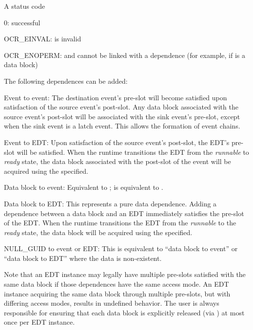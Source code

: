 \returns
A status code
\begin{DoxyItemize}
\item 0\-: successful
\item OCR\_EINVAL:  is invalid
\item OCR\_ENOPERM:  and  cannot be linked with
  a dependence (for example, if  is a data block)
\end{DoxyItemize}

\descr
The following dependences can be added:
\begin{DoxyItemize}
\item Event to event: The destination event's pre-slot will become satisfied
  upon satisfaction of the source event's post-slot. Any data block associated
  with the source event's post-slot will be associated with the sink event's pre-slot,
  except when the sink event is a latch event. This allows the formation of event chains.
\item Event to EDT: Upon satisfaction of the source event's post-slot, the EDT's
  pre-slot will be satisfied. When the runtime transitions the EDT from the
  \emph{runnable} to \emph{ready} state, the data block associated with the
  post-slot of the event will be acquired using the  specified.
\item Data block to event: Equivalent to \hyperlink{func_ocrEventSatisfySlot}{
  };  is
  equivalent to .
\item Data block to EDT: This represents a pure data dependence. Adding a
  dependence between a data block and an EDT immediately satisfies the pre-slot
  of the EDT. When the runtime transitions the EDT from the \emph{runnable}
  to the \emph{ready} state, the data block will be acquired using the
   specified.
\item NULL\_GUID to event or EDT: This is equivalent to ``data block to event''
  or ``data block to EDT'' where the data is non-existent.
\end{DoxyItemize}

Note that an EDT instance may legally have multiple pre-slots satisfied with the same
data block if those dependences have the same access mode. An EDT instance acquiring the
same data block through multiple pre-slots, but with differing access modes, results in
undefined behavior. The user is always responsible for ensuring that each data block is
explicitly released (via \hyperlink{func_ocrDbRelease}{}) at most once
per EDT instance.

